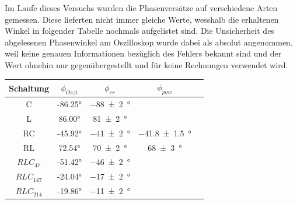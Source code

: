 \documentclass[11pt,ngerman]{scrartcl}
\begin{document}
Im Laufe dieses Versuchs wurden die Phasenversätze auf verschiedene Arten
gemessen. Diese lieferten nicht immer gleiche Werte, wesshalb die erhaltenen
Winkel in folgender Tabelle nochmals aufgelistet sind. Die Unsicherheit des
abgelesenen Phasenwinkel am Oszilloskop wurde dabei als absolut angenommen,
weil keine genauen Informationen bezüglich des Fehlers bekannt sind und der
Wert ohnehin nur gegenübergestellt und für keine Rechnungen verwendet wird.

\begin{table}[H]
	\begin{center}
		\begin{tabular}{|c|c|c|c|c|} \hline
			Schaltung   & $\phi_{Oszi}$ & $\phi_{er}$          & $\phi_{pow}$            \\ \hline
			C           & -86.25°       & \SI{-88(2)}{\degree} &                         \\ \hline
			L           & 86.00°        & \SI{81(2)}{\degree}  &                         \\ \hline
			RC          & -45.92°       & \SI{-41(2)}{\degree} & \SI{-41.8(15)}{\degree} \\ \hline
			RL          & 72.54°        & \SI{70(2)}{\degree}  & \SI{68(3)}{\degree}     \\ \hline
			$RLC_{47}$  & -51.42°       & \SI{-46(2)}{\degree} &                         \\ \hline
			$RLC_{147}$ & -24.04°       & \SI{-17(2)}{\degree} &                         \\ \hline
			$RLC_{214}$ & -19.86°       & \SI{-11(2)}{\degree} &                         \\ \hline
		\end{tabular}
		\label{tab:p_vgl}
	\end{center}
\end{table}
\end{document}
